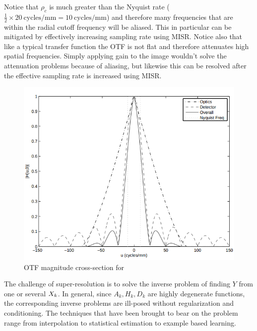 %
Notice that $\rho_c$ is much greater than the Nyquist rate ($\frac{1}{2} \times 20~\text{cycles}/\text{mm} = 10~\text{cycles}/\text{mm}$) and therefore many frequencies that are within the radial cutoff frequency will be aliased.
%
This in particular can be mitigated by effectively increasing sampling rate using MISR.
%
Notice also that like a typical transfer function the OTF is not flat and therefore attenuates high spatial frequencies.
%
Simply applying gain to the image wouldn't solve the attenuation problems because of aliasing, but likewise this can be resolved after the effective sampling rate is increased using MISR.
\begin{figure}
	\includegraphics[width=\linewidth,keepaspectratio]{figures/background/mtf.png}
	\caption{OTF magnitude cross-section for\cite{milanfar2017super}}
	\label{fig:mtf}
\end{figure}

The challenge of super-resolution is to solve the inverse problem of finding $Y$ from one or several $X_k$.
%
In general, since $A_k, H_k, D_k$ are highly degenerate functions, the corresponding inverse problems are ill-posed without regularization and conditioning.
%
The techniques that have been brought to bear on the problem range from interpolation to statistical estimation to example based learning.
